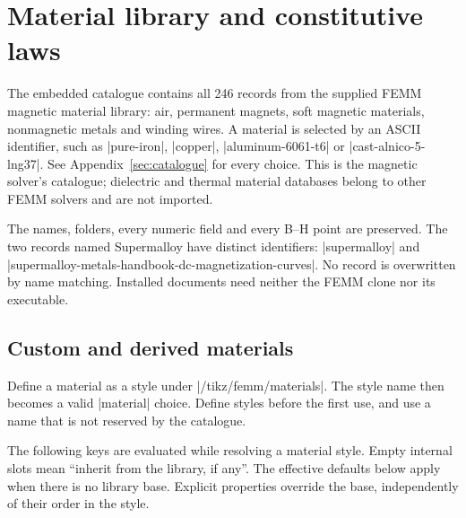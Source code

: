 \section{Material library and constitutive laws}
\label{sec:materials}
The embedded catalogue contains all 246 records from the supplied FEMM
magnetic material library: air, permanent magnets, soft magnetic materials,
nonmagnetic metals and winding wires. A material is selected by an ASCII
identifier, such as |pure-iron|, |copper|, |aluminum-6061-t6| or
|cast-alnico-5-lng37|. See Appendix~\ref{sec:catalogue} for every choice.
This is the magnetic solver's catalogue; dielectric and thermal material
databases belong to other FEMM solvers and are not imported.

The names, folders, every numeric field and every B--H point are preserved.
The two records named Supermalloy have distinct identifiers:
|supermalloy| and
|supermalloy-metals-handbook-dc-magnetization-curves|. No record is
overwritten by name matching. Installed documents need neither the FEMM
clone nor its executable.

\subsection{Custom and derived materials}
Define a material as a style under |/tikz/femm/materials|. The style name
then becomes a valid |material| choice. Define styles before the first
use, and use a name that is not reserved by the catalogue.
\begin{codeexample}
\end{codeexample}

The following keys are evaluated while resolving a material style. Empty
internal slots mean ``inherit from the library, if any''. The effective
defaults below apply when there is no library base. Explicit properties
override the base, independently of their order in the style.

